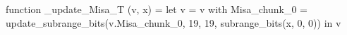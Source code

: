 function _update_Misa_T (v, x) = let v = { v with Misa_chunk_0 = update_subrange_bits(v.Misa_chunk_0, 19, 19, subrange_bits(x, 0, 0)) } in
  v
